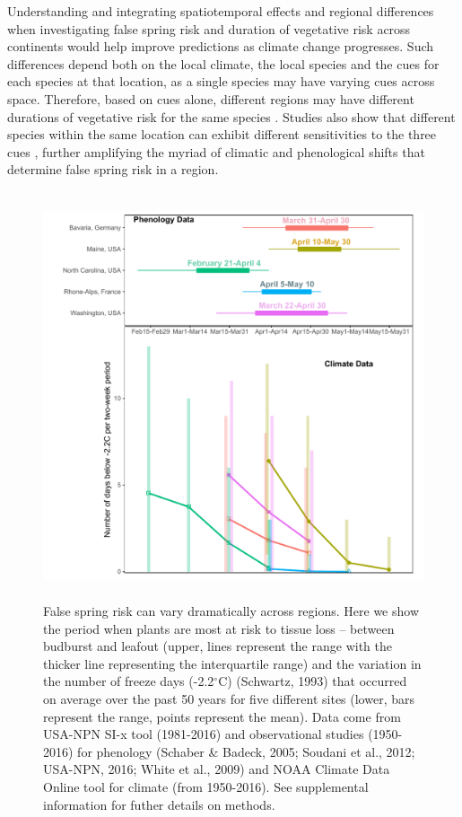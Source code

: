 \documentclass{article}\usepackage[]{graphicx}\usepackage[]{color}
\begin{document}
Understanding and integrating spatiotemporal effects and regional differences when investigating false spring risk and duration of vegetative risk across continents would help improve predictions as climate change progresses. Such differences depend both on the local climate, the local species and the cues for each species at that location, as a single species may have varying cues across space. Therefore, based on cues alone, different regions may have different durations of vegetative risk for the same species \citep {Caffarra2011, Partanen2004, Viheraaarnio2006}. Studies also show that different species within the same location can exhibit different sensitivities to the three cues \citep{Basler2012, Laube2013}, further amplifying the myriad of climatic and phenological shifts that determine false spring risk in a region. 
\begin{figure} [H] 
 \begin{center}
 \includegraphics[width=12cm, height=12cm]{..//figure/RegRisk_flipped.pdf} 
 \caption{False spring risk can vary dramatically across regions. Here we show the period when plants are most at risk to tissue loss -- between budburst and leafout (upper, lines represent the range with the thicker line representing the interquartile range) and the variation in the number of freeze days (-2.2$^{\circ}$C) (Schwartz, 1993) that occurred on average over the past 50 years for five different sites (lower, bars represent the range, points represent the mean). Data come from USA-NPN SI-x tool (1981-2016) and observational studies (1950-2016) for phenology (Schaber \& Badeck, 2005; Soudani et al., 2012; USA-NPN, 2016; White et al., 2009) and NOAA Climate Data Online tool for climate (from 1950-2016). See supplemental information for futher details on methods. } \label{fig:region}  
 \end{center}
 \end{figure}
\end{document}
